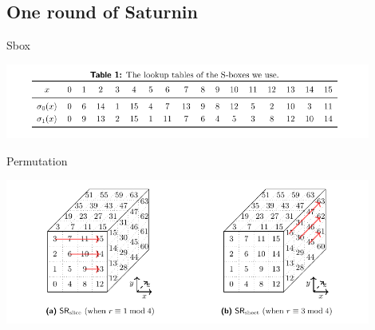 \subsection{One round of Saturnin}

\begin{frame}{Sbox}

\begin{center}
\includegraphics[width=0.9\textwidth,height=0.9\textheight,keepaspectratio]{Images/Figures/sbox.png}
\end{center}


\end{frame}

\begin{frame}{Permutation}

    \begin{center}
\includegraphics[width=0.9\textwidth,height=0.9\textheight,keepaspectratio]{Images/Figures/2.png}
\end{center}
\end{frame}

